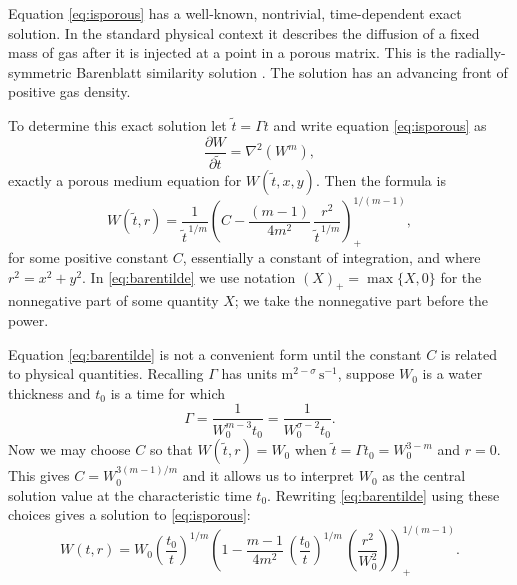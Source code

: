 \documentclass[11pt]{amsart}
\begin{document}
Equation \eqref{eq:isporous} has a well-known, nontrivial, time-dependent exact solution.  In the standard physical context it describes the diffusion of a fixed mass of gas after it is injected at a point in a porous matrix.  This is the radially-symmetric Barenblatt similarity solution \citep[e.g.][]{Barenblatt,Barenblatt1952,Evans,VazquezPME}.  The solution has an advancing front of positive gas density.

To determine this exact solution let $\tilde t = \Gamma t$ and write equation \eqref{eq:isporous} as
   $$\frac{\partial W}{\partial \tilde t} = \nabla^2 \left( W^m\right),$$
exactly a porous medium equation for $W(\tilde t,x,y)$.  Then the formula is \citep{Evans}
\begin{equation} \label{eq:barentilde}
  W(\tilde t,r) = \frac{1}{{\tilde t}^{\,1/m}} \left(C - \frac{(m-1)}{4m^2}\, \frac{r^2}{{\tilde t}^{\,1/m}}\right)_+^{1/(m-1)},
\end{equation}
for some positive constant $C$, essentially a constant of integration, and where $r^2=x^2+y^2$.  In \eqref{eq:barentilde} we use notation $(X)_+ = \max\{X,0\}$ for the nonnegative part of some quantity $X$; we take the nonnegative part before the power.

Equation \eqref{eq:barentilde} is not a convenient form until the constant $C$ is related to physical quantities.  Recalling $\Gamma$ has units $\text{m}^{2-\sigma}\,\text{s}^{-1}$, suppose $W_0$ is a water thickness and $t_0$ is a time for which
\begin{equation} \label{eq:Gammatophysical}
	\Gamma = \frac{1}{W_0^{m-3} t_0} = \frac{1}{W_0^{\sigma-2} t_0}.
\end{equation}
Now we may choose $C$ so that $W(\tilde t,r)=W_0$ when $\tilde t = \Gamma t_0 = W_0^{3-m}$ and $r=0$.  This gives $C=W_0^{3(m-1)/m}$ and it allows us to interpret $W_0$ as the central solution value at the characteristic time $t_0$.  Rewriting \eqref{eq:barentilde} using these choices gives a solution to \eqref{eq:isporous}:
\begin{equation} \label{eq:barenporous}
  W(t,r) = W_0 \left(\frac{t_0}{t}\right)^{1/m} \left(1 - \frac{m-1}{4 m^2} \,\left(\frac{t_0}{t}\right)^{1/m} \,\left(\frac{r^2}{W_0^2}\right)\right)_+^{1/(m-1)}.
\end{equation}
\end{document}

